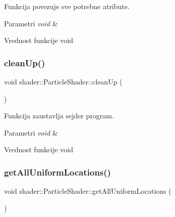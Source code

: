 Funkcija povezuje sve potrebne atribute. 


\begin{DoxyParams}{Parametri}
{\em void} & \\
\hline
\end{DoxyParams}
\begin{DoxyReturn}{Vrednost funkcije}
void 
\end{DoxyReturn}
\mbox{\label{classshader_1_1ParticleShader_a541dcc9aca73386bc38f7f364af20a16}} 
\subsubsection{\texorpdfstring{clean\+Up()}{cleanUp()}}
{\footnotesize\ttfamily void shader\+::\+Particle\+Shader\+::clean\+Up (\begin{DoxyParamCaption}\item[{void}]{ }\end{DoxyParamCaption})}



Funkcija zaustavlja sejder program. 


\begin{DoxyParams}{Parametri}
{\em void} & \\
\hline
\end{DoxyParams}
\begin{DoxyReturn}{Vrednost funkcije}
void 
\end{DoxyReturn}
\mbox{\label{classshader_1_1ParticleShader_a3951e093f0d29d60be87d3aad4d79f06}} 
\subsubsection{\texorpdfstring{get\+All\+Uniform\+Locations()}{getAllUniformLocations()}}
{\footnotesize\ttfamily void shader\+::\+Particle\+Shader\+::get\+All\+Uniform\+Locations (\begin{DoxyParamCaption}\item[{void}]{ }\end{DoxyParamCaption})}



